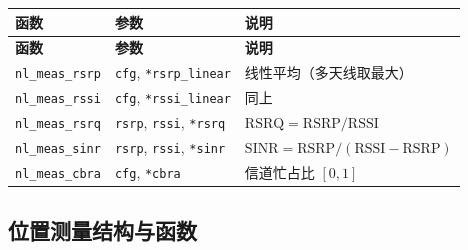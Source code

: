 \documentclass[11pt,a4paper]{ctexart}
\begin{document}
\begin{longtable}{@{}L{3.6cm}L{6.0cm}L{4.9cm}@{}}
\toprule
\textbf{函数} & \textbf{参数} & \textbf{说明} \\
\midrule
\endfirsthead
\toprule\textbf{函数}&\textbf{参数}&\textbf{说明}\\\midrule\endhead
\texttt{nl\_meas\_rsrp} & \texttt{cfg}, \texttt{*rsrp\_linear} & 线性平均（多天线取最大） \\
\texttt{nl\_meas\_rssi} & \texttt{cfg}, \texttt{*rssi\_linear} & 同上 \\
\texttt{nl\_meas\_rsrq} & \texttt{rsrp}, \texttt{rssi}, \texttt{*rsrq} & $\mathrm{RSRQ}=\mathrm{RSRP}/\mathrm{RSSI}$ \\
\texttt{nl\_meas\_sinr} & \texttt{rsrp}, \texttt{rssi}, \texttt{*sinr} & $\mathrm{SINR}=\mathrm{RSRP}/(\mathrm{RSSI}-\mathrm{RSRP})$ \\
\texttt{nl\_meas\_cbra} & \texttt{cfg}, \texttt{*cbra} & 信道忙占比 $[0,1]$ \\
\bottomrule
\end{longtable}

\subsection{位置测量结构与函数}
\end{document}
